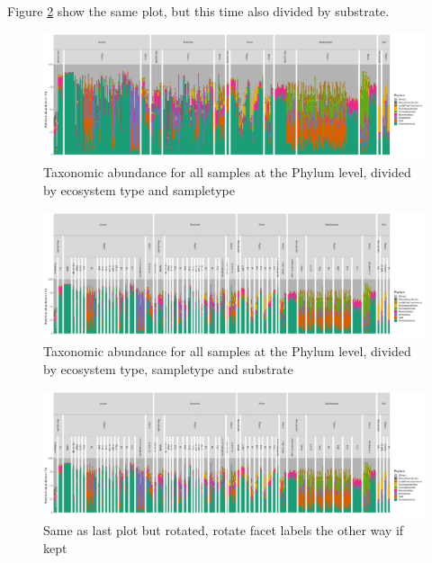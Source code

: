 
Figure \ref{tax_plot_substrate} show the same plot, but this time also divided by substrate.

\begin{figure}[h]
    \centering
    \includegraphics[width = \textwidth]{figure/tax_phylum_ecosystem_sampletype.png}
    \caption{Taxonomic abundance for all samples at the Phylum level, divided by ecosystem type and sampletype}
    \label{tax_plot}
\end{figure}

\begin{figure}[h]
    \centering
    \includegraphics[width = 1.2\textwidth]{figure/tax_phylum_ecosystem_sampletype_substrate.png}
    \caption{Taxonomic abundance for all samples at the Phylum level, divided by ecosystem type, sampletype and substrate}
    \label{tax_plot_substrate}
\end{figure}

\begin{figure}[h]
    \centering
    \includegraphics[width = \textheight, angle = 90]{figure/tax_phylum_ecosystem_sampletype_substrate.png}
    \caption{Same as last plot but rotated, rotate facet labels the other way if kept}
    \label{tax_plot_substrate_flip}
\end{figure}











